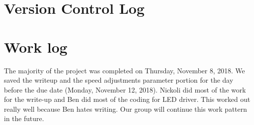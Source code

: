 \documentclass[10pt,english]{article}
\begin{document}
\section{Version Control Log}



\section{Work log}


The majority of the project was completed on Thursday, November 8, 2018. We saved the writeup and the speed adjustments parameter portion for the day before the due date (Monday, November 12, 2018). Nickoli did most of the work for the write-up and Ben did most of the coding for LED driver. This worked out really well because Ben hates writing. Our group will continue this work pattern in the future. 
\end{document}
